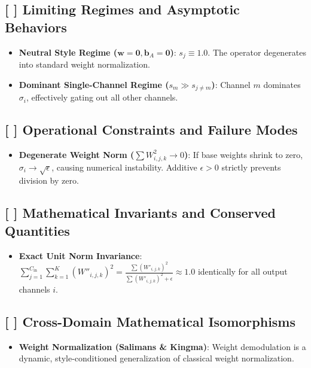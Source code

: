 \documentclass[11pt,a4paper]{article}
\theoremstyle{definition}
\begin{document}
\subsection{[ ] Limiting Regimes and Asymptotic Behaviors}
\begin{itemize}
    \item \textbf{Neutral Style Regime ($\mathbf{w} = \mathbf{0}, \mathbf{b}_A = \mathbf{0}$)}: $s_j \equiv 1.0$. The operator degenerates into standard weight normalization.
    \item \textbf{Dominant Single-Channel Regime ($s_m \gg s_{j \ne m}$)}: Channel $m$ dominates $\sigma_i$, effectively gating out all other channels.
\end{itemize}

\subsection{[ ] Operational Constraints and Failure Modes}
\begin{itemize}
    \item \textbf{Degenerate Weight Norm ($\sum W_{i, j, k}^2 \to 0$)}: If base weights shrink to zero, $\sigma_i \to \sqrt{\epsilon}$, causing numerical instability. Additive $\epsilon > 0$ strictly prevents division by zero.
\end{itemize}

\subsection{[ ] Mathematical Invariants and Conserved Quantities}
\begin{itemize}
    \item \textbf{Exact Unit Norm Invariance}: $\sum_{j=1}^{C_{\text{in}}} \sum_{k=1}^K (W''_{i, j, k})^2 = \frac{\sum (W'_{i, j, k})^2}{\sum (W'_{i, j, k})^2 + \epsilon} \approx 1.0$ identically for all output channels $i$.
\end{itemize}

\subsection{[ ] Cross-Domain Mathematical Isomorphisms}
\begin{itemize}
    \item \textbf{Weight Normalization (Salimans \& Kingma)}: Weight demodulation is a dynamic, style-conditioned generalization of classical weight normalization.
\end{itemize}
\end{document}
